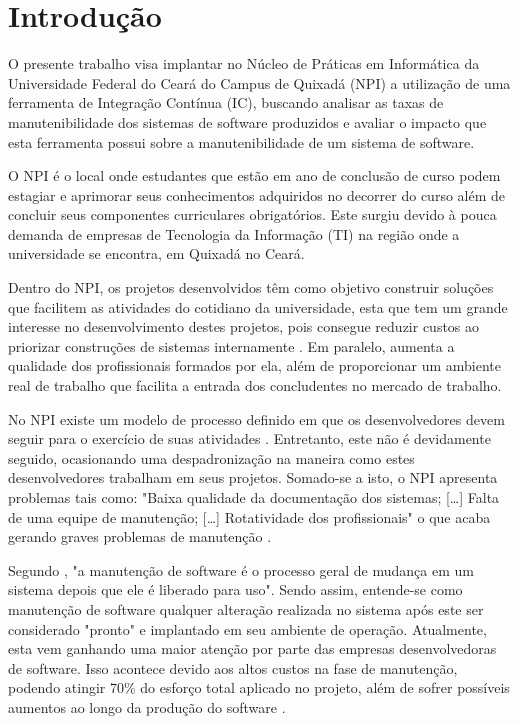 \chapter{Introdução}

O presente trabalho visa implantar no Núcleo de Práticas em Informática da Universidade Federal do Ceará do Campus de Quixadá (NPI) a utilização de uma ferramenta de Integração Contínua (IC), buscando analisar as taxas de manutenibilidade dos sistemas de software produzidos e avaliar o impacto que esta ferramenta possui sobre a manutenibilidade de um sistema de software.

O NPI é o local onde estudantes que estão em ano de conclusão de curso podem estagiar e aprimorar seus conhecimentos adquiridos no decorrer do curso além de concluir seus componentes curriculares obrigatórios. Este surgiu devido à pouca demanda de empresas de Tecnologia da Informação (TI) na região onde a universidade se encontra, em Quixadá no Ceará.

Dentro do NPI, os projetos desenvolvidos têm como objetivo construir soluções que facilitem as atividades do cotidiano da universidade, esta que tem um grande interesse no desenvolvimento destes projetos, pois consegue reduzir custos ao priorizar construções de sistemas internamente \cite{npi2013}. Em paralelo, aumenta a qualidade dos profissionais formados por ela, além de proporcionar um ambiente real de trabalho que facilita a entrada dos concludentes no mercado de trabalho.

No NPI existe um modelo de processo definido em que os desenvolvedores devem seguir para o exercício de suas atividades \cite{npi2013}. Entretanto, este não é devidamente seguido, ocasionando uma despadronização na maneira como estes  desenvolvedores trabalham em seus projetos. Somado-se a isto, o NPI apresenta problemas tais como: "Baixa qualidade da documentação dos sistemas; [\ldots] Falta de uma equipe de manutenção; [\ldots] Rotatividade dos profissionais" o que acaba gerando graves problemas de manutenção \cite[p.~4]{paduelli2006}.


Segundo , "a manutenção de software é o processo geral de mudança em um sistema depois que ele é liberado para uso". Sendo assim, entende-se como manutenção de software  qualquer alteração realizada no sistema após este ser considerado "pronto" e implantado em seu ambiente de operação. Atualmente, esta vem ganhando uma maior atenção por parte das empresas desenvolvedoras de software. Isso acontece devido aos altos custos na fase de manutenção, podendo atingir 70\% do esforço total aplicado no projeto, além de sofrer possíveis aumentos ao longo da produção do software \cite{pressman2010}.

